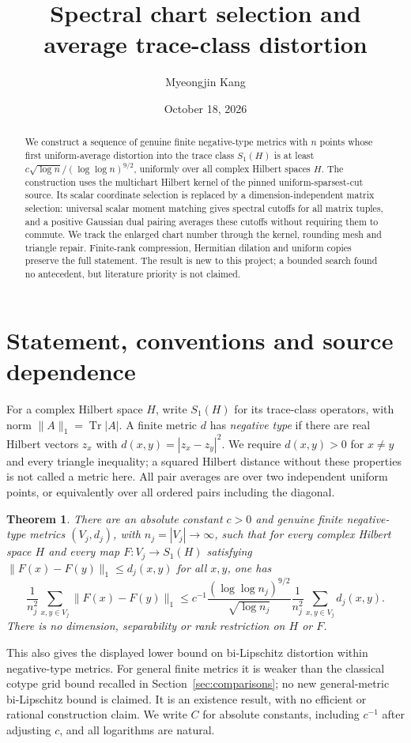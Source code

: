 \documentclass[11pt]{article}
\title{Spectral chart selection and\\average trace-class distortion}
\author{Myeongjin Kang}
\date{October 18, 2026}
\newtheorem{theorem}{Theorem}[section]
\theoremstyle{remark}\newtheorem{remark}[theorem]{Remark}
\numberwithin{equation}{section}
\DeclareMathOperator{\Tr}{Tr}\DeclareMathOperator{\TV}{TV}
\newcommand{\norm}[1]{\lVert #1\rVert}
\begin{document}
\maketitle
\begin{abstract}
We construct a sequence of genuine finite negative-type metrics with $n$
points whose first uniform-average distortion into the trace class
$S_1(H)$ is at least $c\sqrt{\log n}/(\log\log n)^{9/2}$, uniformly over
all complex Hilbert spaces $H$. The construction uses the multichart
Hilbert kernel of the pinned uniform-sparsest-cut source. Its scalar
coordinate selection is replaced by a dimension-independent matrix
selection: universal scalar moment matching gives spectral cutoffs for
all matrix tuples, and a positive Gaussian dual pairing averages these
cutoffs without requiring them to commute. We track the enlarged chart
number through the kernel, rounding mesh and triangle repair. Finite-rank
compression, Hermitian dilation and uniform copies preserve the full
statement. The result is new to this project; a bounded search found no
antecedent, but literature priority is not claimed.
\end{abstract}

\section{Statement, conventions and source dependence}
For a complex Hilbert space $H$, write $S_1(H)$ for its trace-class
operators, with norm $\norm{A}_1=\Tr|A|$. A finite metric $d$ has
\emph{negative type} if there are real Hilbert vectors $z_x$ with
$d(x,y)=|z_x-z_y|^2$. We require $d(x,y)>0$ for $x\ne y$ and every triangle
inequality; a squared Hilbert distance without these properties is not
called a metric here. All pair averages are over two independent uniform
points, or equivalently over all ordered pairs including the diagonal.

\begin{theorem}\label{thm:main}
There are an absolute constant $c>0$ and genuine finite negative-type
metrics $(V_j,d_j)$, with $n_j=|V_j|\to\infty$, such that for every complex
Hilbert space $H$ and every map $F:V_j\to S_1(H)$ satisfying
$\norm{F(x)-F(y)}_1\le d_j(x,y)$ for all $x,y$, one has
\begin{equation}\label{eq:main}
 \frac1{n_j^2}\sum_{x,y\in V_j}\norm{F(x)-F(y)}_1
 \le c^{-1}\frac{(\log\log n_j)^{9/2}}{\sqrt{\log n_j}}
       \frac1{n_j^2}\sum_{x,y\in V_j}d_j(x,y).
\end{equation}
There is no dimension, separability or rank restriction on $H$ or $F$.
\end{theorem}
This also gives the displayed lower bound on bi-Lipschitz distortion
within negative-type metrics. For general finite metrics it is weaker
than the classical cotype grid bound recalled in
Section~\ref{sec:comparisons}; no new general-metric bi-Lipschitz bound
is claimed. It is an existence result, with no efficient or rational construction
claim. We write $C$ for absolute constants, including $c^{-1}$ after
adjusting $c$, and all logarithms are natural.
\end{document}

